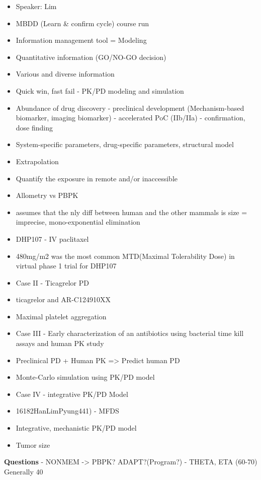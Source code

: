 \documentclass[]{book}
\providecommand{\tightlist}{%
  \setlength{\itemsep}{0pt}\setlength{\parskip}{0pt}}
\begin{document}
\begin{itemize}
\tightlist
\item
  Speaker: Lim
\item
  MBDD (Learn \& confirm cycle) course run
\item
  Information management tool = Modeling
\item
  Quantitative information (GO/NO-GO decision)
\item
  Various and diverse information
\item
  Quick win, fast fail - PK/PD modeling and simulation
\item
  Abundance of drug discovery - preclinical development (Mechanism-based
  biomarker, imaging biomarker) - accelerated PoC (IIb/IIa) -
  confirmation, dose finding
\item
  System-specific parameters, drug-specific parameters, structural model
\item
  Extrapolation
\item
  Quantify the exposure in remote and/or inaccessible
\item
  Allometry vs PBPK
\item
  assumes that the nly diff between human and the other mammals is size
  = imprecise, mono-exponential elimination
\item
  DHP107 - IV paclitaxel
\item
  480mg/m2 was the most common MTD(Maximal Tolerability Dose) in virtual
  phase 1 trial for DHP107
\item
  Case II - Ticagrelor PD
\item
  ticagrelor and AR-C124910XX
\item
  Maximal platelet aggregation
\item
  Case III - Early characterization of an antibiotics using bacterial
  time kill assays and human PK study
\item
  Preclinical PD + Human PK =\textgreater{} Predict human PD
\item
  Monte-Carlo simulation using PK/PD model
\item
  Case IV - integrative PK/PD Model
\item
  16182HanLimPyung441) - MFDS
\item
  Integrative, mechanistic PK/PD model
\item
  Tumor size
\end{itemize}

\textbf{Questions} - NONMEM -\textgreater{} PBPK? ADAPT?(Program?) -
THETA, ETA (60-70) Generally 40
\end{document}
